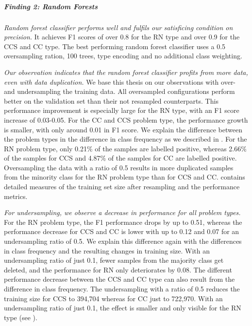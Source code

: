 \subparagraph{Finding 2: Random Forests}
\textit{Random forest classifier performs well and fulfils our satisficing condition on precision.} It achieves F1 scores of over 0.8 for the RN type and over 0.9 for the CCS and CC type.
The best performing random forest classifier uses a 0.5 oversampling ration, 100 trees, type encoding and no additional class weighting.


\textit{Our observation indicates that the random forest classifier profits from more data, even with data duplication.} We base this thesis on our observations with over- and undersampling the training data. 
All oversampled configurations perform better on the validation set than their not resampled counterparts. This performance improvement is especially large for the RN type, with an F1 score increase of 0.03-0.05. For the CC and CCS problem type, the performance growth is smaller, with only around 0.01 in F1 score. We explain the difference between the problem types in the difference in class frequency as we described in . For the RN problem type, only 0.21\% of the samples are labelled positive, whereas 2.66\% of the samples for CCS and 4.87\% of the samples for CC are labelled positive. Oversampling the data with a ratio of 0.5 results in more duplicated samples from the minority class for the RN problem type than for CCS and CC.  contains detailed measures of the training set size after resampling and the performance metrics.

\textit{For undersampling, we observe a decrease in performance for all problem types.} For the RN problem type, the F1 performance drops by up to 0.51, whereas the performance decrease for CCS and CC is lower with up to 0.12 and 0.07 for an undersampling ratio of 0.5. We explain this difference again with the differences in class frequency and the resulting changes in training size. With an undersampling ratio of just 0.1, fewer samples from the majority class get deleted, and the performance for RN only deteriorates by 0.08.
The different performance decrease between the CCS and CC type can also result from the difference in class frequency. The undersampling with a ratio of 0.5 reduces the training size for CCS to 394,704 whereas for CC just to 722,970. With an undersampling ratio of just 0.1, the effect is smaller and only visible for the RN type (see ).


